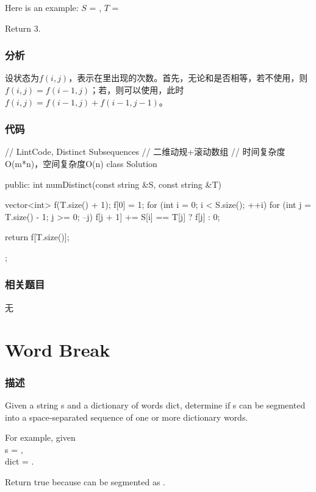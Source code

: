 Here is an example:
$S$ = , $T$ = 

Return 3.


\subsubsection{分析}
设状态为$f(i,j)$，表示在里出现的次数。首先，无论和是否相等，若不使用，则$f(i,j)=f(i-1,j)$；若，则可以使用，此时$f(i,j)=f(i-1,j)+f(i-1, j-1)$。


\subsubsection{代码}
\begin{Code}
// LintCode, Distinct Subsequences
// 二维动规+滚动数组
// 时间复杂度O(m*n)，空间复杂度O(n)
class Solution {
public:
    int numDistinct(const string &S, const string &T) {
        vector<int> f(T.size() + 1);
        f[0] = 1;
        for (int i = 0; i < S.size(); ++i) {
            for (int j = T.size() - 1; j >= 0; --j) {
                f[j + 1] += S[i] == T[j] ? f[j] : 0;
            }
        }

        return f[T.size()];
    }
};
\end{Code}


\subsubsection{相关题目}
\begindot
\item 无
\myenddot


\section{Word Break} %
\label{sec:word-break}


\subsubsection{描述}
Given a string s and a dictionary of words dict, determine if s can be segmented into a space-separated sequence of one or more dictionary words.

For example, given \\
s = ,\\
dict = .

Return true because  can be segmented as .


